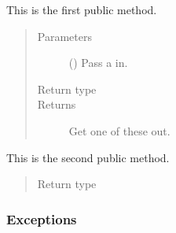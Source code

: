 \documentclass[letterpaper,10pt,english]{sphinxmanual}
\begin{document}
\begin{fulllineitems}
\begin{fulllineitems}
\label{\detokenize{_autosummary/planetscope.mymodule1.myClass1:planetscope.mymodule1.myClass1.myMethod1}}
\sphinxAtStartPar
This is the first public method.
\begin{quote}\begin{description}
\item[{Parameters}] \leavevmode
\sphinxAtStartPar
{} () \textendash{} Pass a  in.

\item[{Return type}] \leavevmode
\sphinxAtStartPar
{}

\item[{Returns}] \leavevmode
\sphinxAtStartPar
Get one of these out.

\end{description}\end{quote}

\end{fulllineitems}


\begin{fulllineitems}
\label{\detokenize{_autosummary/planetscope.mymodule1.myClass1:planetscope.mymodule1.myClass1.myMethod2}}
\sphinxAtStartPar
This is the second public method.
\begin{quote}\begin{description}
\item[{Return type}] \leavevmode
\sphinxAtStartPar
{}

\end{description}\end{quote}

\end{fulllineitems}


\end{fulllineitems}

\subsubsection*{Exceptions}
\end{document}
